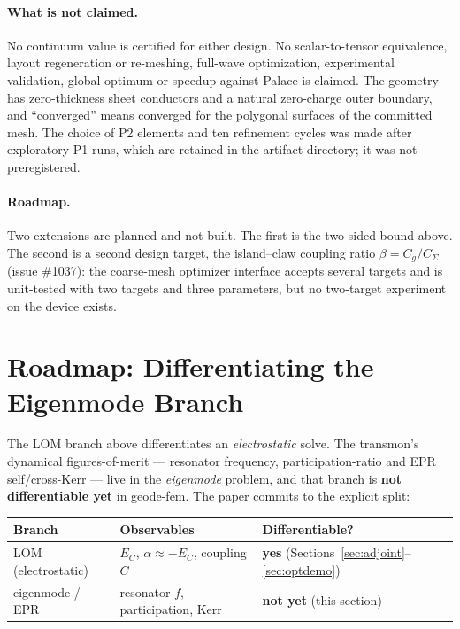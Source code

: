 \documentclass{anvil-paper}
\begin{document}
\paragraph{What is not claimed.}
No continuum value is certified for either design. No scalar-to-tensor
equivalence, layout regeneration or re-meshing, full-wave optimization,
experimental validation, global optimum or speedup against Palace is
claimed. The geometry has zero-thickness sheet conductors and a natural
zero-charge outer boundary, and ``converged'' means converged for the
polygonal surfaces of the committed mesh. The choice of P2 elements and
ten refinement cycles was made after exploratory P1 runs, which are
retained in the artifact directory; it was not preregistered.

\paragraph{Roadmap.}
Two extensions are planned and not built. The first is the two-sided
bound above. The second is a second design target, the island--claw
coupling ratio $\beta = C_g/C_\Sigma$ (issue \#1037): the coarse-mesh
optimizer interface accepts several targets and is unit-tested with two
targets and three parameters, but no two-target experiment on the
device exists.

\section{Roadmap: Differentiating the Eigenmode Branch}
\label{sec:roadmap}

The LOM branch above differentiates an \emph{electrostatic} solve. The
transmon's dynamical figures-of-merit --- resonator frequency,
participation-ratio and EPR self/cross-Kerr \citep{minev2021,nigg2012}
--- live in the \emph{eigenmode} problem, and that branch is \textbf{not
differentiable yet} in geode-fem. The paper commits to the explicit
split:

\begin{table}[h]
  \centering
  \small
  \begin{tabular}{@{}lll@{}}
    \toprule
    Branch & Observables & Differentiable? \\
    \midrule
    LOM (electrostatic) & $E_C$, $\alpha \approx -E_C$, coupling $C$ &
      \textbf{yes} (Sections~\ref{sec:adjoint}--\ref{sec:optdemo}) \\
    eigenmode / EPR & resonator $f$, participation, Kerr &
      \textbf{not yet} (this section) \\
    \bottomrule
  \end{tabular}
\end{table}
\end{document}
